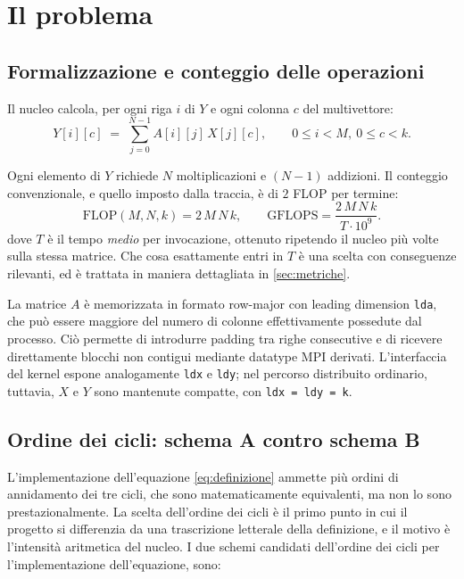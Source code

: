 \chapter{Il problema}\label{cap:problema}

\section{Formalizzazione e conteggio delle operazioni}

Il nucleo calcola, per ogni riga $i$ di $Y$ e ogni colonna $c$ del multivettore:
\begin{equation}
  Y[i][c] \;=\; \sum_{j=0}^{N-1} A[i][j]\, X[j][c],
  \qquad 0 \le i < M,\ 0 \le c < k .
  \label{eq:definizione}
\end{equation}

Ogni elemento di $Y$ richiede $N$ moltiplicazioni e $(N-1)$ addizioni. Il conteggio
convenzionale, e quello imposto dalla traccia, è di $2$ FLOP per termine:
\begin{equation}
  \mathrm{FLOP}(M,N,k) = 2\,M\,N\,k ,
  \qquad
  \mathrm{GFLOPS} = \frac{2\,M\,N\,k}{T \cdot 10^{9}} .
  \label{eq:flops}
\end{equation}
dove $T$ è il tempo \emph{medio} per invocazione, ottenuto ripetendo il nucleo più
volte sulla stessa matrice. Che cosa esattamente entri in $T$ è una scelta con
conseguenze rilevanti, ed è trattata in maniera dettagliata in \cref{sec:metriche}.

\medskip

La matrice $A$ è memorizzata in formato row-major con leading dimension \texttt{lda},
che può essere maggiore del numero di colonne effettivamente possedute dal processo.
Ciò permette di introdurre padding tra righe consecutive e di ricevere direttamente
blocchi non contigui mediante datatype MPI derivati.
L'interfaccia del kernel espone analogamente \texttt{ldx} e \texttt{ldy}; nel percorso distribuito ordinario,
tuttavia, $X$ e $Y$ sono mantenute compatte, con \texttt{ldx = ldy = k}.

\color{red}
\section{Ordine dei cicli: schema A contro schema B}
\label{sec:schemi}

L'implementazione dell'equazione \ref{eq:definizione} ammette
più ordini di annidamento dei tre cicli, che sono matematicamente equivalenti,
ma non lo sono prestazionalmente. La scelta dell'ordine dei cicli è il primo
punto in cui il progetto si differenzia da una trascrizione letterale della
definizione, e il motivo è l'intensità aritmetica del nucleo.
I due schemi candidati dell'ordine dei cicli per l'implementazione dell'equazione, sono:

